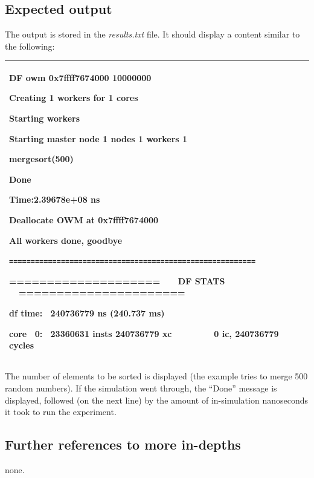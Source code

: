 \documentclass[a4paper]{article}
\begin{document}
\subsection[Expected output]{Expected output}
{
The output is stored in the \textit{results.txt} file. It should display
a content similar to the following:}

\begin{flushleft}
\tablehead{}
\begin{supertabular}{|m{6.29346in}|}
\hline
{\ttfamily DF owm 0x7ffff7674000 10000000}

{\ttfamily Creating 1 workers for 1 cores}

{\ttfamily Starting workers}

{\ttfamily Starting master node 1 nodes 1
workers 1}

{\ttfamily mergesort(500)}

{\ttfamily Done}

{\ttfamily Time:2.39678e+08 ns}

{\ttfamily Deallocate OWM at 0x7ffff7674000}

{\ttfamily All workers done, goodbye}

{
\texttt{=========================================================}}

{\ttfamily ==================== \ \ \ DF STATS
\ \ ======================}

{\ttfamily df time: \ 240736779 ns (240.737 ms)}

\ttfamily core \ 0: \ 23360631 insts 240736779
xc \ \ \ \ \ \ \ \ 0 ic, 240736779 cycles\\\hline
\end{supertabular}
\end{flushleft}
{
The number of elements to be sorted is displayed (the example tries to
merge 500 random numbers). If the simulation went through, the
{\textquotedblleft}Done{\textquotedblright} message is displayed,
followed (on the next line) by the amount of in-simulation nanoseconds
it took to run the experiment.}

\subsection[Further references to more in{}-depths]{Further references
to more in-depths}
{
none. }
\end{document}
